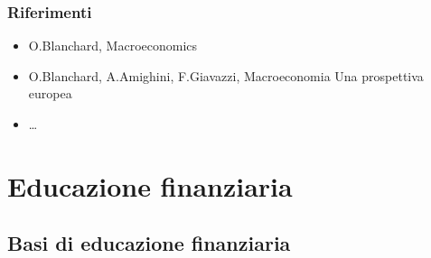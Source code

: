 \documentclass[letterpaper,10pt,italian]{jupyterBook}
\begin{document}
\section{Riferimenti}
\label{\detokenize{ch/macro:riferimenti}}\begin{itemize}
\item {} 
\sphinxAtStartPar
O.Blanchard, Macroeconomics

\item {} 
\sphinxAtStartPar
O.Blanchard, A.Amighini, F.Giavazzi, Macroeconomia \sphinxhyphen{} Una prospettiva europea

\item {} 
\sphinxAtStartPar
…

\end{itemize}

\sphinxstepscope


\part{Educazione finanziaria}

\sphinxstepscope


\chapter{Basi di educazione finanziaria}
\label{\detokenize{ch/fin-edu:basi-di-educazione-finanziaria}}\label{\detokenize{ch/fin-edu:economics-hs-fin-edu}}\label{\detokenize{ch/fin-edu::doc}}






\renewcommand{\indexname}{Indice}
\printindex
\end{document}
